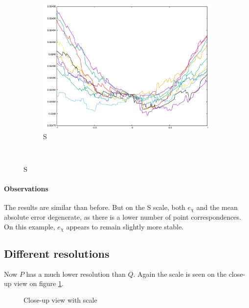 {\begin{figure}[H]
\begin{subfigure}{.33\textwidth}
	\includegraphics[width=\linewidth]{fig/ajherr/t2/S_mae.pdf}
	\caption{S}
\end{subfigure}\\
\end{figure}

\paragraph{Observations} The results are similar than before. But on the S scale, both $e_{\chi}$ and the mean absolute error degenerate, as there is a lower number of point correspondences. On this example, $e_{\chi}$ appears to remain slightly more stable.


\newpage

\subsection{Different resolutions}
Now $P$ has a much lower resolution than $Q$. Again the scale is seen on the close-up view on figure \ref{fig:t3_scale}.

\begin{figure}[h]
\center
{
\setlength{\fboxsep}{0pt}%
\setlength{\fboxrule}{0.5pt}%
}
\caption{Close-up view with scale}
\label{fig:t3_scale}
\end{figure}


}
